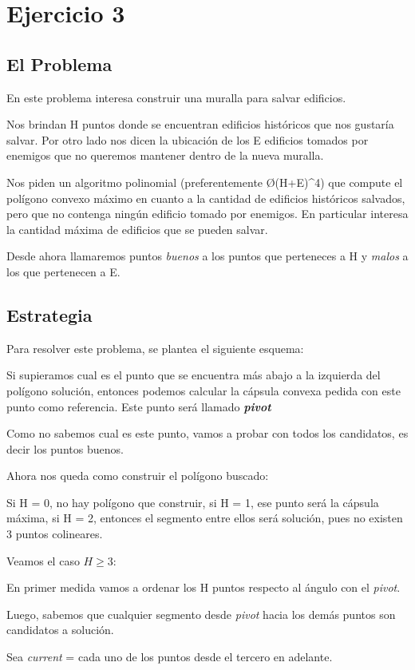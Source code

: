 \section{Ejercicio 3}
\subsection{El Problema}
En este problema interesa construir una muralla para salvar edificios.

Nos brindan H puntos donde se encuentran edificios históricos que nos gustaría salvar. Por otro lado nos dicen la ubicación de los E edificios tomados por enemigos que no queremos mantener dentro de la nueva muralla.

Nos piden un algoritmo polinomial (preferentemente \O{(H+E)^4}) que compute el polígono convexo máximo en cuanto a la cantidad de edificios históricos salvados, pero que no contenga ningún edificio tomado por enemigos. En particular interesa la cantidad máxima de edificios que se pueden salvar.

Desde ahora llamaremos puntos \textit{buenos} a los puntos que perteneces a H y \textit{malos} a los que pertenecen a E.

\subsection{Estrategia}
Para resolver este problema, se plantea el siguiente esquema:

Si supieramos cual es el punto que se encuentra más abajo a la izquierda del polígono solución, entonces podemos calcular la cápsula convexa pedida con este punto como referencia. Este punto será llamado \textit{\textbf{pivot}}

Como no sabemos cual es este punto, vamos a probar con todos los candidatos, es decir los puntos buenos.

Ahora nos queda como construir el polígono buscado:

Si H = 0, no hay polígono que construir, si H = 1, ese punto será la cápsula máxima, si H = 2, entonces el segmento entre ellos será solución, pues no existen 3 puntos colineares.

Veamos el caso $H \geq 3$:

En primer medida vamos a ordenar los H puntos respecto al ángulo con el \textit{pivot}.

Luego, sabemos que cualquier segmento desde \textit{pivot} hacia los demás puntos son candidatos a solución.

Sea \textit{current} = cada uno de los puntos desde el tercero en adelante.

